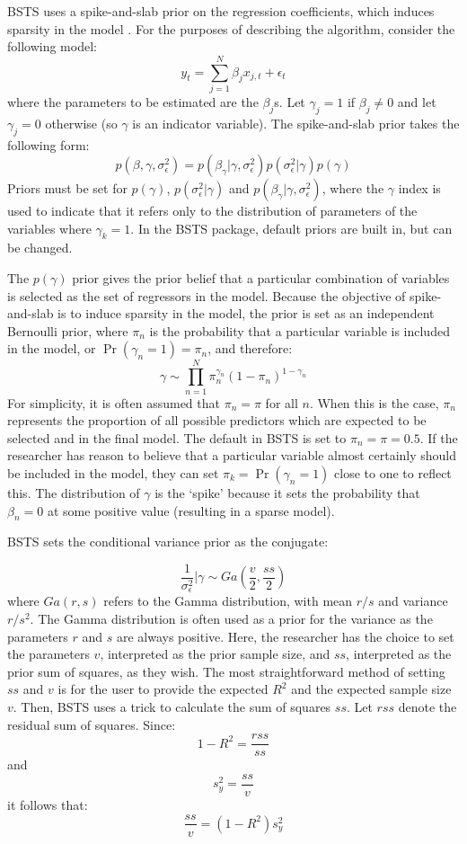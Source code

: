 BSTS uses a spike-and-slab prior on the regression coefficients, which induces sparsity in the model \cite{spikeandslab}. For the purposes of describing the algorithm, consider the following model:
$$y_{t} = \sum_{j=1}^{N}\beta_{j}x_{j,t} + \epsilon_{t}$$
where the parameters to be estimated are the $\beta_{j}$s. Let $\gamma_{j} = 1$ if $\beta_{j}\neq 0$ and let $\gamma_{j} = 0$ otherwise (so $\gamma$ is an indicator variable). The spike-and-slab prior takes the following form:
$$ p(\beta, \gamma, \sigma_{\epsilon}^{2}) = p(\beta_{\gamma} | \gamma, \sigma_{\epsilon}^{2})p(\sigma_{\epsilon}^{2}| \gamma) p(\gamma)$$
Priors must be set for $p(\gamma)$, $p(\sigma_{\epsilon}^{2} | \gamma)$ and $p(\beta_{\gamma} | \gamma, \sigma_{\epsilon}^{2})$, where the $\gamma$ index is used to indicate that it refers only to the distribution of parameters of the variables where $\gamma_{k} = 1$. In the BSTS package, default priors are built in, but can be changed. 

The $p(\gamma)$ prior gives the prior belief that a particular combination of variables is selected as the set of regressors in the model.  Because the objective of spike-and-slab is to induce sparsity in the model, the prior is set as an independent Bernoulli prior, where $\pi_n$ is the probability that a particular variable is included in the model, or $\Pr(\gamma_n = 1) = \pi_{n}$, and therefore:
$$\gamma \sim \prod_{n=1}^{N} \pi_{n}^{\gamma_{n}}(1-\pi_{n})^{1-\gamma_{n}}$$
For simplicity, it is often assumed that $\pi_{n} = \pi$ for all $n$. When this is the case, $\pi_{n}$ represents the proportion of all possible predictors which are expected to be selected and in the final model. The default in BSTS is set to $\pi_{n}=\pi=0.5$. If the researcher has reason to believe that a particular variable almost certainly should be included in the model, they can set $\pi_{k} = \Pr(\gamma_{n} = 1)$ close to one to reflect this. The distribution of $\gamma$ is the `spike' because it sets the probability that $\beta_n = 0$ at some positive value (resulting in a sparse model). 

BSTS sets the conditional variance prior as the conjugate:

$$ \frac{1}{\sigma_{\epsilon}^{2}} | \gamma \sim Ga(\frac{v}{2}, \frac{ss}{2}) $$
where $Ga(r, s)$ refers to the Gamma distribution, with mean $r/s$ and variance $r/s^{2}$. The Gamma distribution is often used as a prior for the variance as the parameters $r$ and $s$ are always positive. Here, the researcher has the choice to set the parameters $v$, interpreted as the prior sample size, and $ss$, interpreted as the prior sum of squares, as they wish. The most straightforward method of setting $ss$ and $v$ is for the user to provide the expected $R^{2}$ and the expected sample size $v$. Then, BSTS uses a trick to calculate the sum of squares $ss$. Let $rss$ denote the residual sum of squares. Since:
$$1-R^{2} = \frac{rss}{ss}$$
and
$$s_{y}^{2}=\frac{ss}{v}$$
it follows that:
$$\frac{ss}{v} = (1-R^{2})s_{y}^{2}$$

